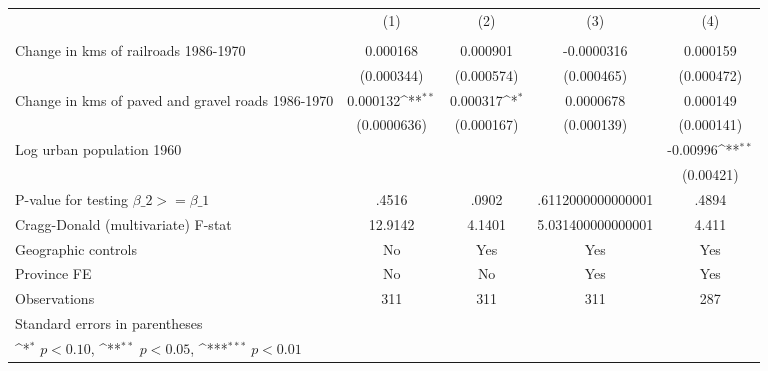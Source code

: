 {
\def\sym#1{\ifmmode^{#1}\else\(^{#1}\)\fi}
\begin{tabular}{l*{4}{c}}
\hline\hline
                &\multicolumn{1}{c}{(1)}&\multicolumn{1}{c}{(2)}&\multicolumn{1}{c}{(3)}&\multicolumn{1}{c}{(4)}\\
                &\multicolumn{1}{c}{}&\multicolumn{1}{c}{}&\multicolumn{1}{c}{}&\multicolumn{1}{c}{}\\
\hline
Change in kms of railroads 1986-1970& 0.000168         & 0.000901         &-0.0000316         & 0.000159         \\
                &(0.000344)         &(0.000574)         &(0.000465)         &(0.000472)         \\
[1em]
Change in kms of paved and gravel roads 1986-1970& 0.000132\sym{**} & 0.000317\sym{*}  &0.0000678         & 0.000149         \\
                &(0.0000636)         &(0.000167)         &(0.000139)         &(0.000141)         \\
[1em]
Log urban population 1960&                  &                  &                  & -0.00996\sym{**} \\
                &                  &                  &                  &(0.00421)         \\
\hline
P-value for testing $\beta\_{2} >= \beta\_{1}$&    .4516         &    .0902         &.6112000000000001         &    .4894         \\
Cragg-Donald (multivariate) F-stat&  12.9142         &   4.1401         &5.031400000000001         &    4.411         \\
Geographic controls&       No         &      Yes         &      Yes         &      Yes         \\
Province FE     &       No         &       No         &      Yes         &      Yes         \\
Observations    &      311         &      311         &      311         &      287         \\
\hline\hline
\multicolumn{5}{l}{\footnotesize Standard errors in parentheses}\\
\multicolumn{5}{l}{\footnotesize \sym{*} \(p<0.10\), \sym{**} \(p<0.05\), \sym{***} \(p<0.01\)}\\
\end{tabular}
}
